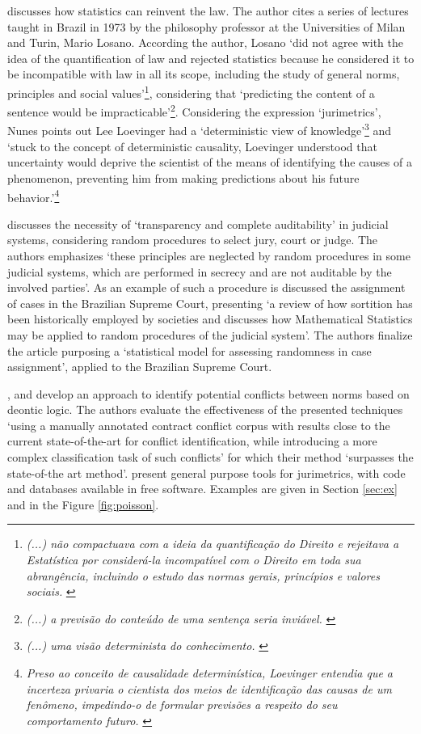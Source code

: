 \documentclass[a4paper]{exam}
\theoremstyle{plain}
\begin{document}
\cite{nunes2016jurimetria} discusses how statistics can reinvent the law. The author cites a series of lectures taught in Brazil in 1973 by the philosophy professor at the Universities of Milan and Turin, Mario Losano. According the author, Losano `did not agree with the idea of the quantification of law and rejected statistics because he considered it to be incompatible with law in all its scope, including the study of general norms, principles and social values'\footnote{\textit{(...) não compactuava com a ideia da quantificação do Direito e rejeitava a Estatística por considerá-la incompatível com o Direito em toda sua abrangência, incluindo o estudo das normas gerais, princípios e valores sociais.} \cite[p. 104]{nunes2016jurimetria}}, considering that `predicting the content of a sentence would be impracticable'\footnote{\textit{(...) a previsão do conteúdo de uma sentença seria inviável.} \cite[p. 105]{nunes2016jurimetria}}. Considering the expression `jurimetrics', Nunes points out Lee Loevinger had a `deterministic view of knowledge'\footnote{\textit{(...) uma visão determinista do conhecimento.} \cite[p. 100]{nunes2016jurimetria}} and `stuck to the concept of deterministic causality, Loevinger understood that uncertainty would deprive the scientist of the means of identifying the causes of a phenomenon, preventing him from making predictions about his future behavior.'\footnote{\textit{Preso ao conceito de causalidade determinística, Loevinger entendia que a incerteza privaria o cientista dos meios de identificação das causas de um fenômeno, impedindo-o de formular previsões a respeito do seu comportamento futuro.} \cite[p. 100]{nunes2016jurimetria}}

\cite{marcondes2019assessing} discusses the necessity of `transparency and complete auditability' in judicial systems, considering random procedures to select jury, court or judge. The authors emphasizes `these principles are neglected by random procedures in some judicial systems, which are performed in secrecy and are not auditable by the involved parties'. As an example of such a procedure is discussed the assignment of cases in the Brazilian Supreme Court, presenting `a review of how sortition has been historically employed by societies and discusses how Mathematical Statistics may be applied to random procedures of the judicial system'. The authors finalize the article purposing a `statistical model for assessing randomness in case assignment', applied to the Brazilian Supreme Court.

\cite{aires2017norm}, \cite{aires2019automatic} and \cite{aires2019classification} develop an approach to identify potential conflicts between norms based on deontic logic. The authors evaluate the effectiveness of the presented techniques `using a manually annotated contract conflict corpus with results close to the current state-of-the-art for conflict identification, while introducing a more complex classification task of such conflicts' for which their method `surpasses the state-of-the art method'. \cite{zabala2019jurimetrics} present general purpose tools for jurimetrics, with code and databases  available in free software. Examples are given in Section \ref{sec:ex} and in the Figure \ref{fig:poisson}.
\end{document}
